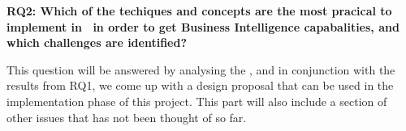 \textbf{RQ2: Which of the techiques and concepts are the most pracical to implement in \genusSoftware~in order to get Business Intelligence capabalities, and which challenges are identified?}

This question will be answered by analysing the \genusSoftware, and in conjunction with the results from RQ1, we come up with a design proposal that can be used in the implementation phase of this project. This part will also include a section of other issues that has not been thought of so far.

%


